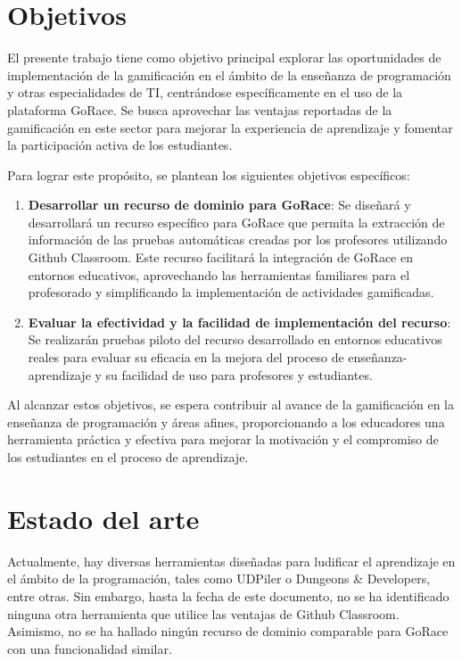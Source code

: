 \section{Objetivos}
El presente trabajo tiene como objetivo principal explorar las oportunidades de implementación de la gamificación en el ámbito de la enseñanza de programación y otras especialidades de \acrshort{TI}, centrándose específicamente en el uso de la plataforma GoRace. Se busca aprovechar las ventajas reportadas de la gamificación en este sector para mejorar la experiencia de aprendizaje y fomentar la participación activa de los estudiantes\cite{EmpiricalBenefitProgramming}\cite{ZHAN2022100096}.

Para lograr este propósito, se plantean los siguientes objetivos específicos:
\begin{enumerate}
    \item \textbf{Desarrollar un recurso de dominio para GoRace}: Se diseñará y desarrollará un recurso específico para GoRace que permita la extracción de información de las pruebas automáticas creadas por los profesores utilizando Github Classroom. Este recurso facilitará la integración de GoRace en entornos educativos, aprovechando las herramientas familiares para el profesorado y simplificando la implementación de actividades gamificadas.
    \item \textbf{Evaluar la efectividad y la facilidad de implementación del recurso}: Se realizarán pruebas piloto del recurso desarrollado en entornos educativos reales para evaluar su eficacia en la mejora del proceso de enseñanza-aprendizaje y su facilidad de uso para profesores y estudiantes.
\end{enumerate}

Al alcanzar estos objetivos, se espera contribuir al avance de la gamificación en la enseñanza de programación y áreas afines, proporcionando a los educadores una herramienta práctica y efectiva para mejorar la motivación y el compromiso de los estudiantes en el proceso de aprendizaje.

\section{Estado del arte}
Actualmente, hay diversas herramientas diseñadas para ludificar el aprendizaje en el ámbito de la programación, tales como UDPiler\cite{EmpiricalBenefitProgramming} o Dungeons \& Developers\cite{dungeonsanddevelopers}, entre otras. Sin embargo, hasta la fecha de este documento, no se ha identificado ninguna otra herramienta que utilice las ventajas de Github Classroom. Asimismo, no se ha hallado ningún recurso de dominio comparable para GoRace con una funcionalidad similar.

